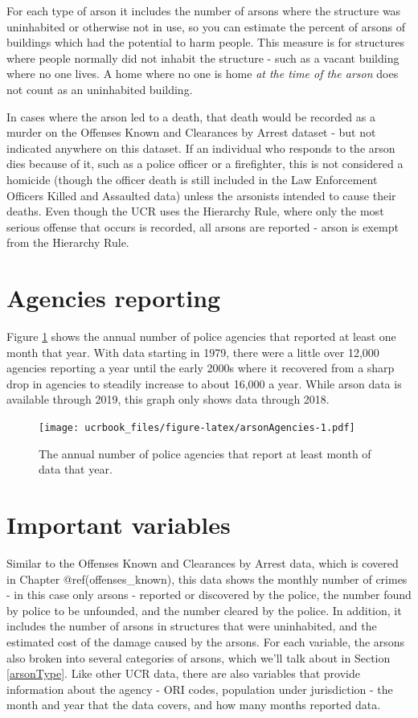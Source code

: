 \documentclass[
  12pt,
  openany]{book}
\begin{document}
For each type of arson it includes the number of arsons where the structure was uninhabited or otherwise not in use, so you can estimate the percent of arsons of buildings which had the potential to harm people. This measure is for structures where people normally did not inhabit the structure - such as a vacant building where no one lives. A home where no one is home \emph{at the time of the arson} does not count as an uninhabited building.

In cases where the arson led to a death, that death would be recorded as a murder on the Offenses Known and Clearances by Arrest dataset - but not indicated anywhere on this dataset. If an individual who responds to the arson dies because of it, such as a police officer or a firefighter, this is not considered a homicide (though the officer death is still included in the Law Enforcement Officers Killed and Assaulted data) unless the arsonists intended to cause their deaths. Even though the UCR uses the Hierarchy Rule, where only the most serious offense that occurs is recorded, all arsons are reported - arson is exempt from the Hierarchy Rule.

\hypertarget{agencies-reporting-2}{%
\section{Agencies reporting}\label{agencies-reporting-2}}

Figure \ref{fig:arsonAgencies} shows the annual number of police agencies that reported at least one month that year. With data starting in 1979, there were a little over 12,000 agencies reporting a year until the early 2000s where it recovered from a sharp drop in agencies to steadily increase to about 16,000 a year. While arson data is available through 2019, this graph only shows data through 2018.

\begin{figure}
\centering
\texttt{[image: ucrbook\_files/figure-latex/arsonAgencies-1.pdf]}
\caption{\label{fig:arsonAgencies}The annual number of police agencies that report at least month of data that year.}
\end{figure}

\hypertarget{important-variables-2}{%
\section{Important variables}\label{important-variables-2}}

Similar to the Offenses Known and Clearances by Arrest data, which is covered in Chapter @ref(offenses\_known), this data shows the monthly number of crimes - in this case only arsons - reported or discovered by the police, the number found by police to be unfounded, and the number cleared by the police. In addition, it includes the number of arsons in structures that were uninhabited, and the estimated cost of the damage caused by the arsons. For each variable, the arsons also broken into several categories of arsons, which we'll talk about in Section \ref{arsonType}. Like other UCR data, there are also variables that provide information about the agency - ORI codes, population under jurisdiction - the month and year that the data covers, and how many months reported data.
\end{document}
